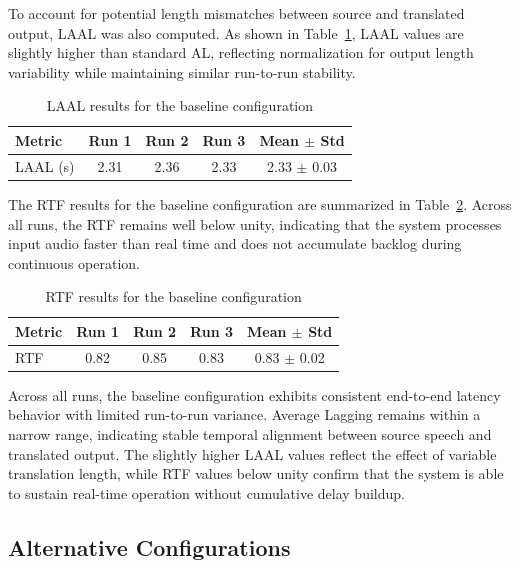 To account for potential length mismatches between source and translated output, LAAL was also computed. As shown in Table~\ref{tab:baseline_laal}, LAAL values are slightly higher than standard AL, reflecting normalization for output length variability while maintaining similar run-to-run stability.

\begin{table}[!htbp]
\centering
\caption[Baseline Length-Adaptive Average Lagging results]{LAAL results for the baseline configuration}
\label{tab:baseline_laal}
\begin{tabular}{lcccc}
\toprule
\textbf{Metric} & \textbf{Run 1} & \textbf{Run 2} & \textbf{Run 3} & \textbf{Mean $\pm$ Std} \\
\midrule
LAAL (s) & 2.31 & 2.36 & 2.33 & 2.33 $\pm$ 0.03 \\
\bottomrule
\end{tabular}
\end{table}

The RTF results for the baseline configuration are summarized in Table~\ref{tab:baseline_rtf}. Across all runs, the RTF remains well below unity, indicating that the system processes input audio faster than real time and does not accumulate backlog during continuous operation.

\begin{table}[!htbp]
\centering
\caption[Baseline Real-Time Factor results]{RTF results for the baseline configuration}
\label{tab:baseline_rtf}
\begin{tabular}{lcccc}
\toprule
\textbf{Metric} & \textbf{Run 1} & \textbf{Run 2} & \textbf{Run 3} & \textbf{Mean $\pm$ Std} \\
\midrule
RTF & 0.82 & 0.85 & 0.83 & 0.83 $\pm$ 0.02 \\
\bottomrule
\end{tabular}
\end{table}

Across all runs, the baseline configuration exhibits consistent end-to-end latency behavior with limited run-to-run variance. Average Lagging remains within a narrow range, indicating stable temporal alignment between source speech and translated output. The slightly higher LAAL values reflect the effect of variable translation length, while RTF values below unity confirm that the system is able to sustain real-time operation without cumulative delay buildup.


\subsection{Alternative Configurations}
\label{subsec:alternative_e2e}

